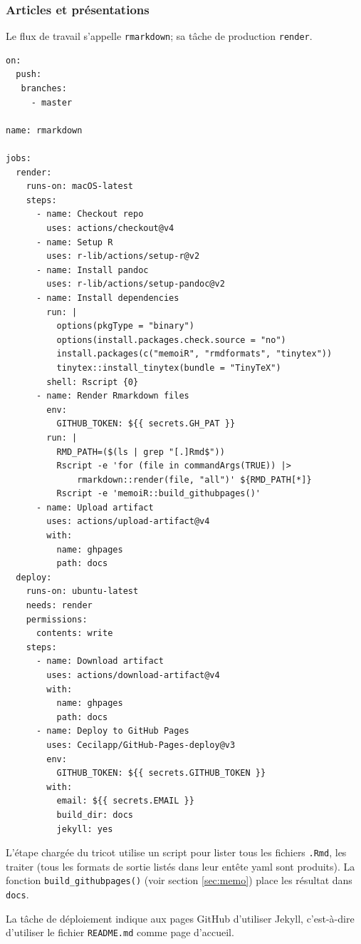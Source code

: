 \documentclass[
  12pt,
  french,
  a4paper,
  extrafontsizes,onecolumn,openright
  ]{memoir}
\begin{document}
\subsubsection{Articles et présentations}\label{articles-et-pruxe9sentations}

Le flux de travail s'appelle \texttt{rmarkdown}; sa tâche de production \texttt{render}.

\begin{verbatim}
on:
  push:
   branches:
     - master

name: rmarkdown

jobs:
  render:
    runs-on: macOS-latest
    steps:
      - name: Checkout repo
        uses: actions/checkout@v4
      - name: Setup R
        uses: r-lib/actions/setup-r@v2
      - name: Install pandoc
        uses: r-lib/actions/setup-pandoc@v2
      - name: Install dependencies
        run: |
          options(pkgType = "binary")
          options(install.packages.check.source = "no")
          install.packages(c("memoiR", "rmdformats", "tinytex"))
          tinytex::install_tinytex(bundle = "TinyTeX")
        shell: Rscript {0}
      - name: Render Rmarkdown files
        env:
          GITHUB_TOKEN: ${{ secrets.GH_PAT }}
        run: |
          RMD_PATH=($(ls | grep "[.]Rmd$"))
          Rscript -e 'for (file in commandArgs(TRUE)) |>
              rmarkdown::render(file, "all")' ${RMD_PATH[*]}
          Rscript -e 'memoiR::build_githubpages()'
      - name: Upload artifact
        uses: actions/upload-artifact@v4
        with:
          name: ghpages
          path: docs
  deploy:
    runs-on: ubuntu-latest
    needs: render
    permissions:
      contents: write
    steps:
      - name: Download artifact
        uses: actions/download-artifact@v4
        with:
          name: ghpages
          path: docs
      - name: Deploy to GitHub Pages
        uses: Cecilapp/GitHub-Pages-deploy@v3
        env:
          GITHUB_TOKEN: ${{ secrets.GITHUB_TOKEN }}
        with:
          email: ${{ secrets.EMAIL }}
          build_dir: docs
          jekyll: yes
\end{verbatim}

L'étape chargée du tricot utilise un script pour lister tous les fichiers \texttt{.Rmd}, les traiter (tous les formats de sortie listés dans leur entête yaml sont produits).
La fonction \texttt{build\_githubpages()} (voir section \ref{sec:memo}) place les résultat dans \texttt{docs}.

La tâche de déploiement indique aux pages GitHub d'utiliser Jekyll, c'est-à-dire d'utiliser le fichier \texttt{README.md} comme page d'accueil.
\end{document}

